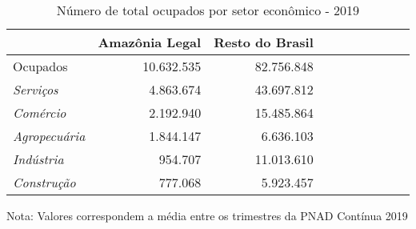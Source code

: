 \begin{table}[H]
\centering
\label{\_retrato\_emprego\_setor\_gstr\_table}
\begin{threeparttable}
\caption{Número de total ocupados por setor econômico - 2019}
\begin{tabular}{l*{3}{rrr}}
\midrule \midrule
                    &Amazônia Legal&Resto do Brasil\\
\midrule
Ocupados            &  10.632.535&  82.756.848\\
\emph{Serviços}    &   4.863.674&  43.697.812\\
\emph{Comércio}    &   2.192.940&  15.485.864\\
\emph{Agropecuária}&   1.844.147&   6.636.103\\
\emph{Indústria}   &     954.707&  11.013.610\\
\emph{Construção} &     777.068&   5.923.457\\
\bottomrule
\end{tabular}
\begin{tablenotes}
\scriptsize{Nota: Valores correspondem a média entre os trimestres da PNAD Contínua 2019}
\end{tablenotes}
\end{threeparttable}
\end{table}
